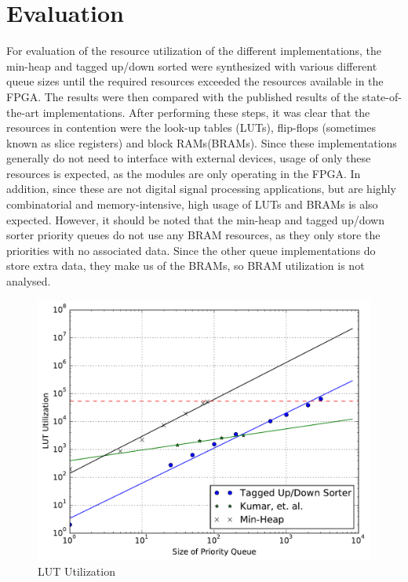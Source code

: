 \section{Evaluation}
\label{sec:eval}

For evaluation of the resource utilization of the different implementations, the min-heap and tagged up/down sorted were synthesized with various different queue sizes until the required resources exceeded the resources available in the FPGA. The results were then compared with the published results of the state-of-the-art implementations. After performing these steps, it was clear that the resources in contention were the look-up tables (LUTs), flip-flops (sometimes known as slice registers) and block RAMs(BRAMs). Since these implementations generally do not need to interface with external devices, usage of only these resources is expected, as the modules are only operating in the FPGA. In addition, since these are not digital signal processing applications, but are highly combinatorial and memory-intensive, high usage of LUTs and BRAMs is also expected. However, it should be noted that the min-heap and tagged up/down sorter priority queues do not use any BRAM resources, as they only store the priorities with no associated data. Since the other queue implementations do store extra data, they make us of the BRAMs, so BRAM utilization is not analysed.

\begin{figure}[t!]
	\centering
	\includegraphics[width=\columnwidth]{data/lut_utilization.pdf}
	\caption{LUT Utilization}
	\label{fig:luts}
\end{figure}

